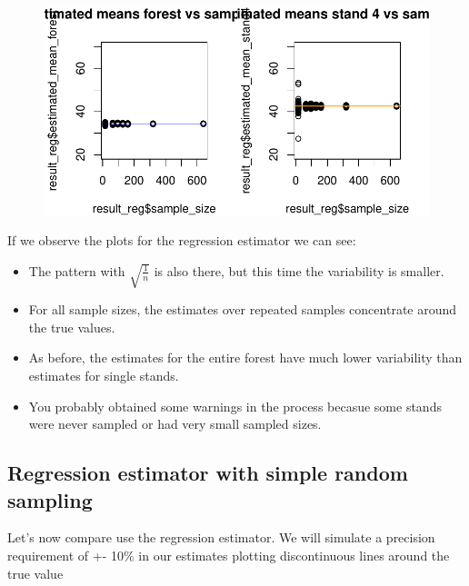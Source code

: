 \documentclass[
  letterpaper,
  DIV=11,
  numbers=noendperiod]{scrartcl}
\begin{document}
\begin{figure}[H]

{\centering \includegraphics{Regression_estimator_files/figure-pdf/unnamed-chunk-6-3.pdf}

}

\end{figure}

If we observe the plots for the regression estimator we can see:

\begin{itemize}
\item
  The pattern with \(\sqrt{\frac{1}{n}}\) is also there, but this time
  the variability is smaller.
\item
  For all sample sizes, the estimates over repeated samples concentrate
  around the true values.
\item
  As before, the estimates for the entire forest have much lower
  variability than estimates for single stands.
\item
  You probably obtained some warnings in the process becasue some stands
  were never sampled or had very small sampled sizes.
\end{itemize}

\hypertarget{regression-estimator-with-simple-random-sampling}{%
\subsection{Regression estimator with simple random
sampling}\label{regression-estimator-with-simple-random-sampling}}

Let's now compare use the regression estimator. We will simulate a
precision requirement of +- 10\% in our estimates plotting discontinuous
lines around the true value
\end{document}
